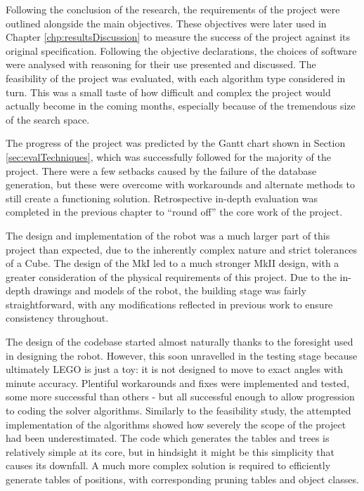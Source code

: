 \documentclass{report}
\newcommand{\lego}{LEGO }
\begin{document}
    Following the conclusion of the research, the requirements of the project were outlined alongside the main objectives. These objectives were later used in Chapter \ref{chp:resultsDiscussion} to measure the success of the project against its original specification. Following the objective declarations, the choices of software were analysed with reasoning for their use presented and discussed. The feasibility of the project was evaluated, with each algorithm type considered in turn. This was a small taste of how difficult and complex the project would actually become in the coming months, especially because of the tremendous size of the search space.
    
    The progress of the project was predicted by the Gantt chart shown in Section \ref{sec:evalTechniques}, which was successfully followed for the majority of the project. There were a few setbacks caused by the failure of the database generation, but these were overcome with workarounds and alternate methods to still create a functioning solution. Retrospective in-depth evaluation was completed in the previous chapter to \enquote{round off} the core work of the project.
    
    The design and implementation of the robot was a much larger part of this project than expected, due to the inherently complex nature and strict tolerances of a Cube. The design of the MkI led to a much stronger MkII design, with a greater consideration of the physical requirements of this project. Due to the in-depth drawings and models of the robot, the building stage was fairly straightforward, with any modifications reflected in previous work to ensure consistency throughout.
    
    The design of the codebase started almost naturally thanks to the foresight used in designing the robot. However, this soon unravelled in the testing stage because ultimately \lego is just a toy: it is not designed to move to exact angles with minute accuracy. Plentiful workarounds and fixes were implemented and tested, some more successful than others - but all successful enough to allow progression to coding the solver algorithms. Similarly to the feasibility study, the attempted implementation of the algorithms showed how severely the scope of the project had been underestimated. The code which generates the tables and trees is relatively simple at its core, but in hindsight it might be this simplicity that causes its downfall. A much more complex solution is required to efficiently generate tables of positions, with corresponding pruning tables and object classes.
    
\end{document}
